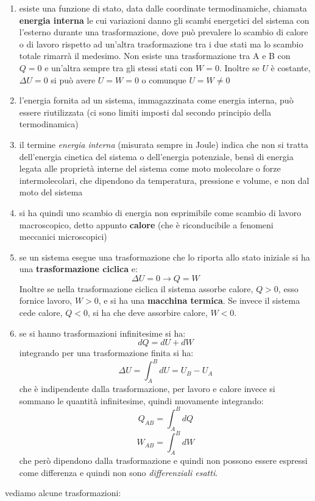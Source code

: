 \documentclass[a4paper,12pt, oneside]{book}
\begin{document}
\begin{enumerate}
\item esiste una funzione di stato, data dalle coordinate termodinamiche, chiamata \textbf{energia interna} le cui variazioni danno gli scambi energetici del sistema con l'esterno durante una trasformazione, dove può prevalere lo scambio di calore o di lavoro rispetto ad un'altra trasformazione tra i due stati ma lo scambio totale rimarrà il medesimo. Non esiste una trasformazione tra A e B con $Q=0$ e un'altra sempre tra gli stessi stati con $W=0$. Inoltre se $U$ è costante, $\Delta U=0$ si può avere $U=W=0$ o comunque $U=W\neq 0$
\item l'energia fornita ad un sistema, immagazzinata come energia interna, può essere riutilizzata (ci sono limiti imposti dal secondo principio della termodinamica)
\item il termine \textit{energia interna} (misurata sempre in Joule) indica che non si tratta dell'energia cinetica del sistema o dell'energia potenziale, bensì di energia legata alle proprietà interne del sistema come moto molecolare o forze intermolecolari, che dipendono da temperatura, pressione e volume, e non dal moto del sistema
\item si ha quindi uno scambio di energia non esprimibile come scambio di lavoro macroscopico, detto appunto \textbf{calore} (che è riconducibile a fenomeni meccanici microscopici)
\item se un sistema esegue una trasformazione che lo riporta allo stato iniziale si ha una \textbf{trasformazione ciclica} e:
$$\Delta U=0\longrightarrow Q=W$$
Inoltre se nella trasformazione ciclica il sistema assorbe calore, $Q>0$, esso fornice lavoro, $W>0$, e si ha una \textbf{macchina termica}. Se invece il sistema cede calore, $Q<0$, si ha che deve assorbire calore, $W<0$.  
\item se si hanno trasformazioni infinitesime si ha:
$$dQ=dU+dW$$
integrando per una trasformazione finita si ha:
$$\Delta U=\int_A^B dU=U_B-U_A$$
che è indipendente dalla trasformazione, per lavoro e calore invece si sommano le quantità infinitesime, quindi nuovamente integrando:
$$Q_{AB}=\int_A^B dQ$$
$$W_{AB}=\int_A^B dW$$
che però dipendono dalla trasformazione e quindi non possono essere espressi come differenza e quindi non sono \textit{differenziali esatti}.
\end{enumerate}
vediamo alcune trasformazioni:
\end{document}
